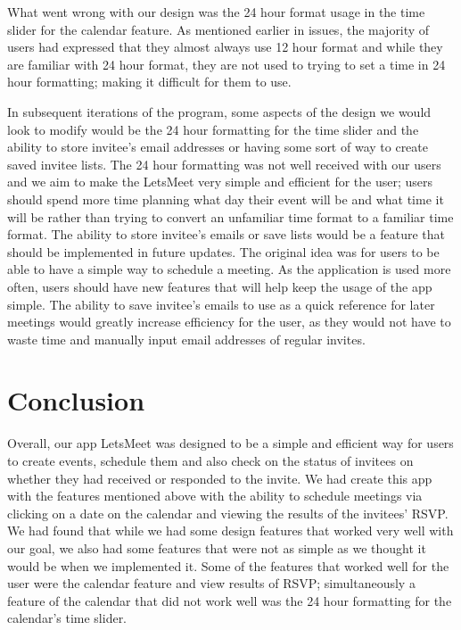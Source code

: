 \documentclass{sigchi}
\begin{document}
What went wrong with our design was the 24 hour format usage in the time slider for the calendar feature. As mentioned earlier in issues, the majority of users had expressed that they almost always use 12 hour format and while they are familiar with 24 hour format, they are not used to trying to set a time in 24 hour formatting; making it difficult for them to use.

In subsequent iterations of the program, some aspects of the design we would look to modify would be the 24 hour formatting for the time slider and the ability to store invitee's email addresses or having some sort of way to create saved invitee lists. The 24 hour formatting was not well received with our users and we aim to make the LetsMeet very simple and efficient for the user; users should spend more time planning what day their event will be and what time it will be rather than trying to convert an unfamiliar time format to a familiar time format. The ability to store invitee's emails or save lists would be a feature that should be implemented in future updates. The original idea was for users to be able to have a simple way to schedule a meeting. As the application is used more often, users should have new features that will help keep the usage of the app simple. The ability to save invitee's emails to use as a quick reference for later meetings would greatly increase efficiency for the user, as they would not have to waste time and manually input email addresses of regular invites.

\section{Conclusion}

Overall, our app LetsMeet was designed to be a simple and efficient way for users to create events, schedule them and also check on the status of invitees on whether they had received or responded to the invite. We had create this app with the features mentioned above with the ability to schedule meetings via clicking on a date on the calendar and viewing the results of the invitees' RSVP. We had found that while we had some design features that worked very well with our goal, we also had some features that were not as simple as we thought it would be when we implemented it. Some of the features that worked well for the user were the calendar feature and view results of RSVP; simultaneously a feature of the calendar that did not work well was the 24 hour formatting for the calendar's time slider. 
\end{document}
